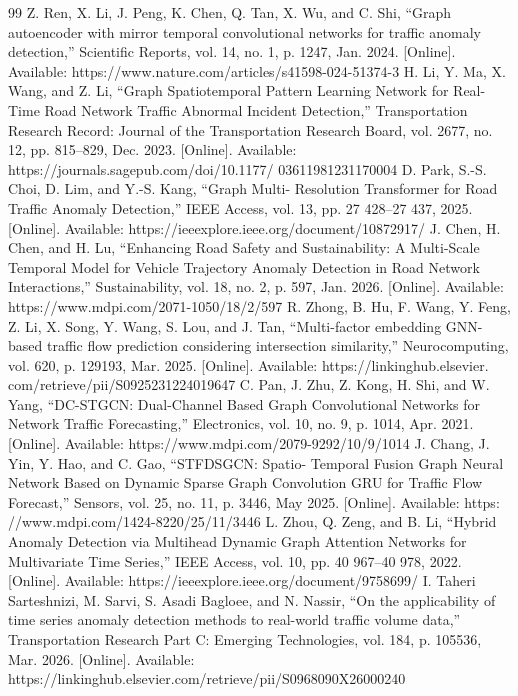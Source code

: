 \begin{thebibliography}{99}
 Z. Ren, X. Li, J. Peng, K. Chen, Q. Tan, X. Wu, and C. Shi, “Graph autoencoder with mirror temporal convolutional networks for traffic anomaly detection,” Scientific Reports, vol. 14, no. 1, p. 1247, Jan. 2024. [Online]. Available: https://www.nature.com/articles/s41598-024-51374-3
 H. Li, Y. Ma, X. Wang, and Z. Li, “Graph Spatiotemporal Pattern Learning Network for Real-Time Road Network Traffic Abnormal Incident Detection,” Transportation Research Record: Journal of the Transportation Research Board, vol. 2677, no. 12, pp. 815–829, Dec. 2023. [Online]. Available: https://journals.sagepub.com/doi/10.1177/ 03611981231170004
 D. Park, S.-S. Choi, D. Lim, and Y.-S. Kang, “Graph Multi- Resolution Transformer for Road Traffic Anomaly Detection,” IEEE Access, vol. 13, pp. 27 428–27 437, 2025. [Online]. Available: https://ieeexplore.ieee.org/document/10872917/
 J. Chen, H. Chen, and H. Lu, “Enhancing Road Safety and Sustainability: A Multi-Scale Temporal Model for Vehicle Trajectory Anomaly Detection in Road Network Interactions,” Sustainability, vol. 18, no. 2, p. 597, Jan. 2026. [Online]. Available: https://www.mdpi.com/2071-1050/18/2/597
 R. Zhong, B. Hu, F. Wang, Y. Feng, Z. Li, X. Song, Y. Wang, S. Lou, and J. Tan, “Multi-factor embedding GNN-based traffic flow prediction considering intersection similarity,” Neurocomputing, vol. 620, p. 129193, Mar. 2025. [Online]. Available: https://linkinghub.elsevier. com/retrieve/pii/S0925231224019647
 C. Pan, J. Zhu, Z. Kong, H. Shi, and W. Yang, “DC-STGCN: Dual-Channel Based Graph Convolutional Networks for Network Traffic Forecasting,” Electronics, vol. 10, no. 9, p. 1014, Apr. 2021. [Online]. Available: https://www.mdpi.com/2079-9292/10/9/1014
 J. Chang, J. Yin, Y. Hao, and C. Gao, “STFDSGCN: Spatio- Temporal Fusion Graph Neural Network Based on Dynamic Sparse Graph Convolution GRU for Traffic Flow Forecast,” Sensors, vol. 25, no. 11, p. 3446, May 2025. [Online]. Available: https: //www.mdpi.com/1424-8220/25/11/3446
 L. Zhou, Q. Zeng, and B. Li, “Hybrid Anomaly Detection via Multihead Dynamic Graph Attention Networks for Multivariate Time Series,” IEEE Access, vol. 10, pp. 40 967–40 978, 2022. [Online]. Available: https://ieeexplore.ieee.org/document/9758699/
 I. Taheri Sarteshnizi, M. Sarvi, S. Asadi Bagloee, and N. Nassir, “On the applicability of time series anomaly detection methods to real-world traffic volume data,” Transportation Research Part C: Emerging Technologies, vol. 184, p. 105536, Mar. 2026. [Online]. Available: https://linkinghub.elsevier.com/retrieve/pii/S0968090X26000240

\end{thebibliography}
